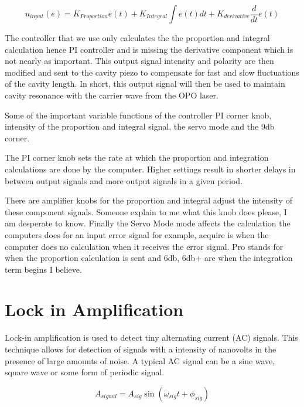 \documentclass[11pt,a4paper]{book}
\begin{document}
			\begin{equation}
				u_{input}(e)=K_{Proportion}e(t)+K_{Integral} \int{e(t)dt} +K_{derivative} \frac{d}{dt}e(t)
			\end{equation}
			
			The controller that we use only calculates the the proportion and integral calculation hence PI controller and is missing the derivative component which is not nearly as important.
			This output signal intensity and polarity are then modified and sent to the cavity piezo to compensate for fast and slow fluctuations of the cavity length. In short, this output signal will then be used to maintain cavity resonance with the carrier wave from the OPO laser. 
			
			Some of the important variable functions of the controller PI corner knob, intensity of the proportion and integral signal, the servo mode and the 9db corner. 
			
			The PI corner knob sets the rate at which the proportion and integration calculations are done by the computer. Higher settings result in shorter delays in between output signals and more output signals in a given period. 
			
			There are amplifier knobs for the proportion and integral adjust the intensity of these component signals. Someone explain to me what this knob does please, I am desperate to know.
			Finally the Servo Mode mode affects the calculation the computers does for an input error signal for example, acquire is when the computer does no calculation when it receives the error signal. Pro stands for when the proportion calculation is sent and 6db, 6db+ are when the integration term begins I believe.
		
	
	
	\section{Lock in Amplification}
		\label{sec:Lock in Amplification}
		Lock-in amplification is used to detect tiny alternating current (AC) signals. This technique allows for detection of signals with a intensity of nanovolts in the presence of large amounts of noise. A typical AC signal can be a sine wave, square wave or some form of periodic signal.
		
		\begin{equation} \label{eq:signal}
			A_{signal} = A_{sig} \sin({\omega_{sig} t + \phi_{sig}}) 
		\end{equation}
		
\end{document}
